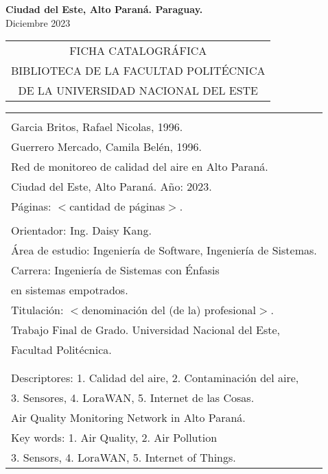 \vspace{4.0cm}
\begin{center}
{\large {\bf Ciudad del Este, Alto Paraná. Paraguay.}\\[6mm]
Diciembre 2023}
\end{center}
\newpage \normalsize
\thispagestyle{empty}
\begin{center} 
\begin{tabular}{c} 
  FICHA CATALOGRÁFICA \\
  BIBLIOTECA DE LA FACULTAD POLITÉCNICA \\
  DE LA UNIVERSIDAD NACIONAL DEL ESTE \\
\end{tabular} %
\vspace{0.3cm}

\begin{tabular}{|l|} \hline %
\\
Garcia Britos, Rafael Nicolas, 1996.\\
Guerrero Mercado, Camila Belén, 1996.\\
Red de monitoreo de calidad del aire en Alto Paraná. \\
Ciudad del Este, Alto Paraná. Año: 2023.\\
Páginas: $<$cantidad de páginas$>$.\\ 
\\
Orientador: Ing. Daisy Kang. \\

Área de estudio: Ingeniería de Software, Ingeniería de Sistemas. \\
Carrera: Ingeniería de Sistemas con Énfasis \\
en sistemas empotrados. \\
Titulación: $<$denominación del (de la) profesional$>$. \\

Trabajo Final de Grado. Universidad Nacional del Este, \\
Facultad Politécnica.\\
\\ \\

Descriptores: 1. Calidad del aire, 2. Contaminación del aire, \\
\hspace{2cm} 3. Sensores, 4. LoraWAN, 5. Internet de las Cosas.\\
Air Quality Monitoring Network in Alto Paraná. \\
Key words: 1. Air Quality, 2. Air Pollution \\
\hspace{2cm} 3. Sensors,  4. LoraWAN, 5. Internet of Things.\\
\hline
\end{tabular}
\end{center}

